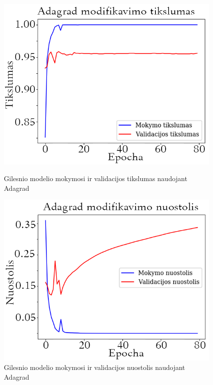 \documentclass{VUMIFPSkursinis}
\begin{document}
\begin{figure}[!htbp]
  \centering
  \begin{minipage}[b]{0.49\textwidth}
    \includegraphics[width=\textwidth]{img/AL/Adagrad_acc1.png}
    \caption{Gilesnio modelio mokymosi ir validacijos tikslumas naudojant Adagrad}
  \end{minipage}
  \begin{minipage}[b]{0.49\textwidth}
    \includegraphics[width=\textwidth]{img/AL/Adagrad_loss1.png}
    \caption{Gilesnio modelio mokymosi ir validacijos nuostolis naudojant Adagrad}
  \end{minipage}
\end{figure}
\end{document}

